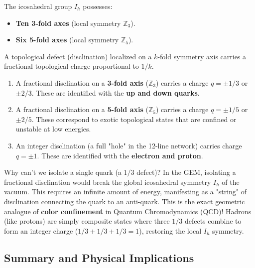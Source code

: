 \begin{definition}
The icosahedral group $I_h$ possesses:
\begin{itemize}
    \item \textbf{Ten 3-fold axes} (local symmetry $\mathbb{Z}_3$).
    \item \textbf{Six 5-fold axes} (local symmetry $\mathbb{Z}_5$).
\end{itemize}
A topological defect (disclination) localized on a $k$-fold symmetry axis carries a fractional topological charge proportional to $1/k$.
\end{definition}

\begin{corollary}
\begin{enumerate}
    \item A fractional disclination on a \textbf{3-fold axis} ($\mathbb{Z}_3$) carries a charge $q = \pm 1/3$ or $\pm 2/3$. These are identified with the \textbf{up and down quarks}.
    \item A fractional disclination on a \textbf{5-fold axis} ($\mathbb{Z}_5$) carries a charge $q = \pm 1/5$ or $\pm 2/5$. These correspond to exotic topological states that are confined or unstable at low energies.
    \item An integer disclination (a full "hole" in the 12-line network) carries charge $q = \pm 1$. These are identified with the \textbf{electron and proton}.
\end{enumerate}
\end{corollary}

\begin{remark}
Why can't we isolate a single quark (a $1/3$ defect)? In the GEM, isolating a fractional disclination would break the global icosahedral symmetry $I_h$ of the vacuum. This requires an infinite amount of energy, manifesting as a "string" of disclination connecting the quark to an anti-quark. This is the exact geometric analogue of \textbf{color confinement} in Quantum Chromodynamics (QCD)! Hadrons (like protons) are simply composite states where three $1/3$ defects combine to form an integer charge ($1/3 + 1/3 + 1/3 = 1$), restoring the local $I_h$ symmetry.
\end{remark}

\subsection{Summary and Physical Implications}

